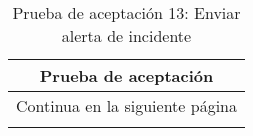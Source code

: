 \begin{longtable}{|p{6.7cm}|p{6.7cm}|}
    \caption{Prueba de aceptación 13: Enviar alerta de incidente} \label{tab:prueba-13}
    \\
    \hline
    \multicolumn{2}{|c|}{\textbf{Prueba de aceptación}}                                                                                                                                                                                                    \\
    \hline

    \endfirsthead

    \hline
    \endhead

    \hline
    \multicolumn{2}{|c|}{{Continua en la siguiente página}}                                                                                                                                                                                                \\
    \hline
    \endfoot


\end{longtable}
